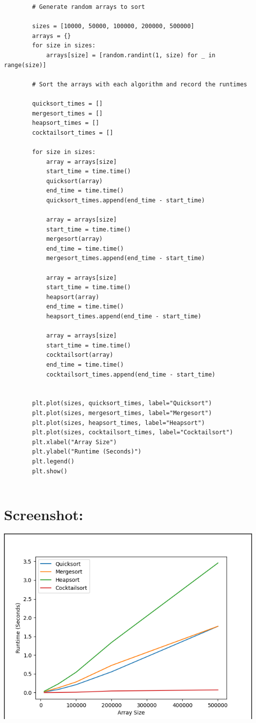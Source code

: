 \begin{verbatim}
        # Generate random arrays to sort
        
        sizes = [10000, 50000, 100000, 200000, 500000]
        arrays = {}
        for size in sizes:
            arrays[size] = [random.randint(1, size) for _ in range(size)]
        
        # Sort the arrays with each algorithm and record the runtimes
        
        quicksort_times = []
        mergesort_times = []
        heapsort_times = []
        cocktailsort_times = []
        
        for size in sizes:
            array = arrays[size]
            start_time = time.time()
            quicksort(array)
            end_time = time.time()
            quicksort_times.append(end_time - start_time)
        
            array = arrays[size]
            start_time = time.time()
            mergesort(array)
            end_time = time.time()
            mergesort_times.append(end_time - start_time)
        
            array = arrays[size]
            start_time = time.time()
            heapsort(array)
            end_time = time.time()
            heapsort_times.append(end_time - start_time)
        
            array = arrays[size]
            start_time = time.time()
            cocktailsort(array)
            end_time = time.time()
            cocktailsort_times.append(end_time - start_time)
        
        
        plt.plot(sizes, quicksort_times, label="Quicksort")
        plt.plot(sizes, mergesort_times, label="Mergesort")
        plt.plot(sizes, heapsort_times, label="Heapsort")
        plt.plot(sizes, cocktailsort_times, label="Cocktailsort")
        plt.xlabel("Array Size")
        plt.ylabel("Runtime (Seconds)")
        plt.legend()
        plt.show()
        
\end{verbatim}
\section*{Screenshot:}
{ \centering \includegraphics[width=\textwidth]{images/lab.png} }